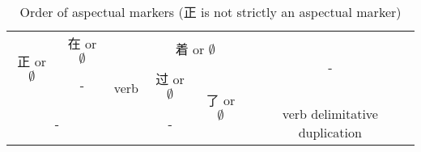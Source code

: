 \begin{table}[]
    \centering
    \caption{Order of aspectual markers (正 is not strictly an aspectual marker)}
    \label{tbl:aspectual-affix}
    \begin{tabular}{|cc|c|cc|c|}
        \hline
        \multicolumn{1}{|c|}{\multirow{2}{*}{正 or $\emptyset$}} & 在 or $\emptyset$ & \multirow{3}{*}{verb} & \multicolumn{2}{c|}{着 or $\emptyset$}                                     & \multirow{2}{*}{-}            \\ \cline{2-2} \cline{4-5}
        \multicolumn{1}{|c|}{}                                  & -                &                       & \multicolumn{1}{c|}{过 or $\emptyset$} & \multirow{2}{*}{了 or $\emptyset$} &                               \\ \cline{1-2} \cline{4-4} \cline{6-6} 
        \multicolumn{2}{|c|}{-}                                                    &                       & \multicolumn{1}{c|}{-}                &                                   & verb delimitative duplication \\ \hline
    \end{tabular}
\end{table}